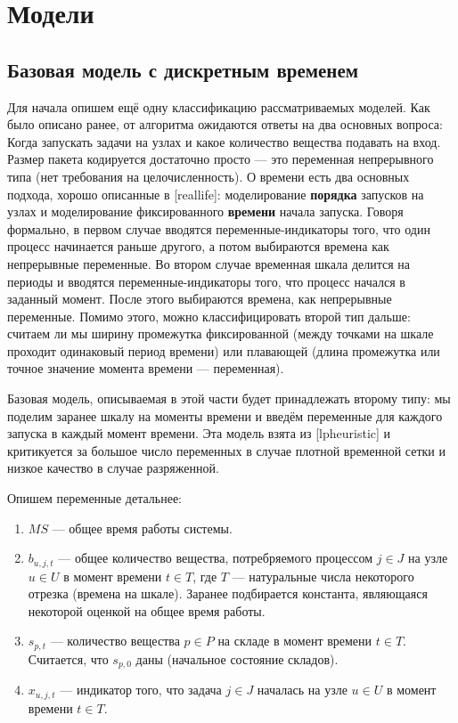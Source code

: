\documentclass[12pt, twoside]{article}
\theoremstyle{definition}
\begin{document}
\section{Модели}
\subsection{Базовая модель с дискретным временем}
\label{subsection:base}

Для начала опишем ещё одну классификацию рассматриваемых моделей. Как было описано ранее, от алгоритма ожидаются ответы на два основных вопроса: Когда запускать задачи на узлах и какое количество вещества подавать на вход. Размер пакета кодируется достаточно просто --- это переменная непрерывного типа (нет требования на целочисленность). О времени есть два основных подхода, хорошо описанные в [reallife]: моделирование \textbf{порядка} запусков на узлах и моделирование фиксированного \textbf{времени} начала запуска. Говоря формально, в первом случае вводятся переменные-индикаторы того, что один процесс начинается раньше другого, а потом выбираются времена как непрерывные переменные. Во втором случае временная шкала делится на периоды и вводятся переменные-индикаторы того, что процесс начался в заданный момент. После этого выбираются времена, как непрерывные переменные. Помимо этого, можно классифицировать второй тип дальше: считаем ли мы ширину промежутка фиксированной (между точками на шкале проходит одинаковый период времени) или плавающей (длина промежутка или точное значение момента времени --- переменная).

Базовая модель, описываемая в этой части будет принадлежать второму типу: мы поделим заранее шкалу на моменты времени и введём переменные для каждого запуска в каждый момент времени. Эта модель взята из [lpheuristic] и критикуется за большое число переменных в случае плотной временной сетки и низкое качество в случае разряженной.

Опишем переменные детальнее: 

\begin{enumerate}

\item $MS$ --- общее время работы системы.
\item $b_{u,j,t}$ --- общее количество вещества, потребряемого процессом $j \in J$ на узле $u \in U$ в момент времени $t \in T$, где $T$ --- натуральные числа некоторого отрезка (времена на шкале). Заранее подбирается константа, являющаяся некоторой оценкой на общее время работы.
\item $s_{p, t}$ --- количество вещества $p \in P$ на складе в момент времени $t \in T$. Считается, что $s_{p, 0}$ даны (начальное состояние складов).
\item $x_{u, j, t}$ --- индикатор того, что задача $j \in J$ началась на узле $u \in U$ в момент времени $t \in T$.

\end{enumerate}
\end{document}
